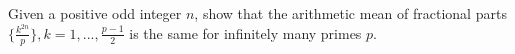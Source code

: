 Given a positive odd integer $n$,  show that the arithmetic mean of fractional parts  $\{\frac{k^{2n}}{p}\}, k=1,..., \frac{p-1}{2}$ is the same for infinitely many primes $p$.